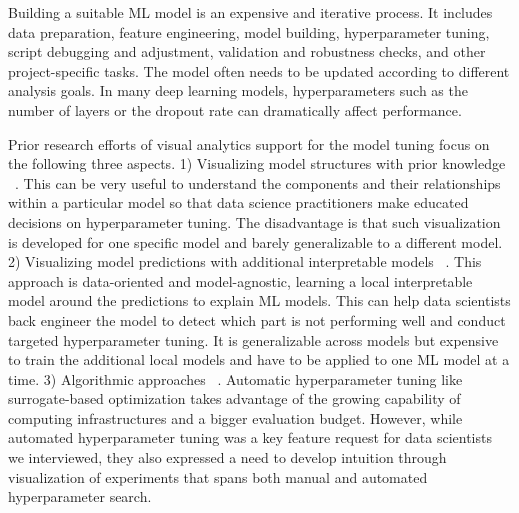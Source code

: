 \documentclass[preprint]{vgtc}        %
\newcommand{\skye}[1]{{ #1}}
\begin{document}
Building a suitable ML model is an expensive and iterative process. It includes data preparation, feature engineering, model building, hyperparameter tuning, script debugging and adjustment, validation and robustness checks, and other project-specific tasks. \skye{The model often needs to be updated according to different analysis goals.} 
In many deep learning models, hyperparameters such as the number of layers or the dropout rate can dramatically affect performance.

Prior research efforts of visual analytics support for the model tuning focus on the following three aspects. 1) Visualizing model structures with prior knowledge ~\cite{Fan-YinTzengOpeningNetworks,Liu2016TowardsNetworks}. This can be very useful to understand the components and their relationships within a particular model so that data science practitioners make educated decisions on hyperparameter tuning. The disadvantage is that such visualization is developed for one specific model and barely generalizable to a different model. 2) Visualizing model predictions with additional interpretable models ~\cite{Ribeiro2016quotWhyYouquot,FongInterpretablePerturbation}. This approach is data-oriented and model-agnostic, learning a local interpretable model around the predictions to explain ML models. This can help data scientists back engineer the model to detect which part is not performing well and conduct targeted hyperparameter tuning. It is generalizable across models but expensive to train the additional local models and have to be applied to one ML model at a time. \skye{3) Algorithmic approaches ~\cite{Bardenet2013CollaborativeTuning,YogatamaEfficientTuning}. Automatic hyperparameter tuning like surrogate-based optimization takes advantage of the growing capability of computing infrastructures and a bigger evaluation budget. However, while automated hyperparameter tuning was a key feature request for data scientists we interviewed, they also expressed a need to develop intuition through visualization of experiments that spans both manual and automated hyperparameter search.}
\end{document}

